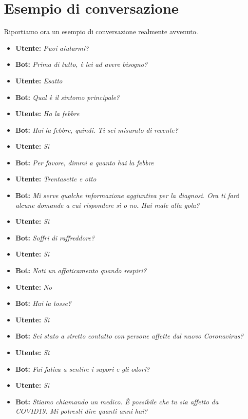 \section{Esempio di conversazione}
Riportiamo ora un esempio di conversazione realmente avvenuto.
\begin{itemize}
    \item \textbf{Utente:} \textit{Puoi aiutarmi?}
    \item \textbf{Bot:} \textit{Prima di tutto, è lei ad avere bisogno?}
    \item \textbf{Utente:} \textit{Esatto}
    \item \textbf{Bot:} \textit{Qual è il sintomo principale?}
    \item \textbf{Utente:} \textit{Ho la febbre}
    \item \textbf{Bot:} \textit{Hai la febbre, quindi. Ti sei misurato di recente?}
    \item \textbf{Utente:} \textit{Sì}
    \item \textbf{Bot:} \textit{Per favore, dimmi a quanto hai la febbre}
    \item \textbf{Utente:} \textit{Trentasette e otto}
    \item \textbf{Bot:} \textit{Mi serve qualche informazione aggiuntiva per la diagnosi. Ora ti farò alcune domande a cui rispondere sì o no. Hai male alla gola?}
    \item \textbf{Utente:} \textit{Sì}
    \item \textbf{Bot:} \textit{Soffri di raffreddore?}
    \item \textbf{Utente:} \textit{Sì}
    \item \textbf{Bot:} \textit{Noti un affaticamento quando respiri?}
    \item \textbf{Utente:} \textit{No}
    \item \textbf{Bot:} \textit{Hai la tosse?}
    \item \textbf{Utente:} \textit{Sì}
    \item \textbf{Bot:} \textit{Sei stato a stretto contatto con persone affette dal nuovo Coronavirus?}
    \item \textbf{Utente:} \textit{Sì}
    \item \textbf{Bot:} \textit{Fai fatica a sentire i sapori e gli odori?}
    \item \textbf{Utente:} \textit{Sì}
    \item \textbf{Bot:} \textit{Stiamo chiamando un medico. È possibile che tu sia affetto da COVID19. Mi potresti dire quanti anni hai?}

\end{itemize}
